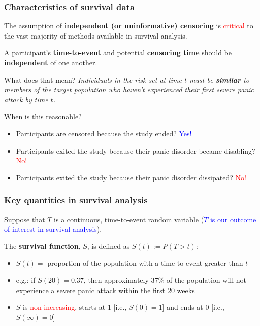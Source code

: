 \documentclass[12pt, 
hyperref={colorlinks=true, linkcolor=blue, urlcolor=cyan},dvipsnames]{beamer}
\begin{document}
\begin{frame}
\frametitle{Characteristics of survival data}
The assumption of \textbf{independent (or uninformative) censoring} is \textcolor{red}{critical} to the vast majority of methods available in survival analysis.

A participant's \textbf{time-to-event} and potential \textbf{censoring time} should be \textbf{independent} of one another.

What does that mean? \pause \textit{Individuals in the risk set at time $t$ must be \textbf{similar} to members of the target population who haven't experienced their first severe panic attack by time $t$.}

When is this reasonable? \vspace{-0.3cm}
\begin{itemize}
\item Participants are censored because the study ended? \pause \textcolor{blue}{Yes!}
\item Participants exited the study because their panic disorder became disabling? \pause \textcolor{red}{No!}
\item Participants exited the study because their panic disorder dissipated? \pause \textcolor{red}{No!}
\end{itemize}
\end{frame}

\begin{frame}
\frametitle{Key quantities in survival analysis}
Suppose that $T$ is a continuous, time-to-event random variable (\textcolor{blue}{$T$ is our outcome of interest in survival analysis}).

The \textbf{survival function}, $S$, is defined as $S(t) := P(T > t)$:
\begin{itemize}
\item $S(t) = $ proportion of the population with a time-to-event greater than $t$
\item e.g.: if $S(20) = 0.37$, then approximately 37\% of the population will not experience a severe panic attack within the first 20 weeks
\item $S$ is \textcolor{red}{non-increasing}, starts at 1 [i.e., $S(0) = 1$] and ends at 0 [i.e., $S(\infty) = 0$]
\end{itemize}
\end{frame}
\end{document}
